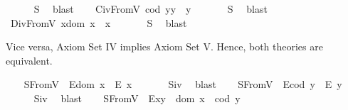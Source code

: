\begin{isabellebody}
%
\isadelimproof
\ \ \ \ %
\endisadelimproof
%
\isatagproof
{}\isamarkupfalse%
\ S{}\ \isamarkupfalse%
\ blast%
\endisatagproof
{\isafoldproof}%
%
\isadelimproof
\isanewline
%
\endisadelimproof
\ \ \isamarkupfalse%
\ C\isactrlsub i\isactrlsub vFromV{\isacharcolon}\ {\isachardoublequoteopen}{\isacharparenleft}cod\ y{\isacharparenright}{\isasymcdot}y\ {\isasymcong}\ y{\isachardoublequoteclose}\ \isanewline
%
\isadelimproof
\ \ \ \ %
\endisadelimproof
%
\isatagproof
{}\isamarkupfalse%
\ S{}\ \isamarkupfalse%
\ blast%
\endisatagproof
{\isafoldproof}%
%
\isadelimproof
\isanewline
%
\endisadelimproof
\ \ \isamarkupfalse%
\ D\isactrlsub i\isactrlsub vFromV{\isacharcolon}\ {\isachardoublequoteopen}x{\isasymcdot}{\isacharparenleft}dom\ x{\isacharparenright}\ {\isasymcong}\ x{\isachardoublequoteclose}\ \isanewline
%
\isadelimproof
\ \ \ \ %
\endisadelimproof
%
\isatagproof
{}\isamarkupfalse%
\ S{}\ \isamarkupfalse%
\ blast%
\endisatagproof
{\isafoldproof}%
%
\isadelimproof
%
\endisadelimproof
%
\begin{isamarkuptext}%
Vice versa, Axiom Set IV implies Axiom Set V. Hence, both theories are
 equivalent.%
\end{isamarkuptext}\isamarkuptrue%
\ \ \isamarkupfalse%
\ S{}FromV{\isacharcolon}\ \ {\isachardoublequoteopen}E{\isacharparenleft}dom\ x{\isacharparenright}\ \isactrlbold {\isasymrightarrow}\ E\ x{\isachardoublequoteclose}\ \isanewline
%
\isadelimproof
\ \ \ \ %
\endisadelimproof
%
\isatagproof
{}\isamarkupfalse%
\ S\isactrlsub i\isactrlsub v\ \isamarkupfalse%
\ blast%
\endisatagproof
{\isafoldproof}%
%
\isadelimproof
\isanewline
%
\endisadelimproof
\ \ \isamarkupfalse%
\ S{}FromV{\isacharcolon}\ \ {\isachardoublequoteopen}E{\isacharparenleft}cod\ y{\isacharparenright}\ \isactrlbold {\isasymrightarrow}\ E\ y{\isachardoublequoteclose}\ \isanewline
%
\isadelimproof
\ \ \ \ %
\endisadelimproof
%
\isatagproof
{}\isamarkupfalse%
\ S\isactrlsub i\isactrlsub v\ \isamarkupfalse%
\ blast%
\endisatagproof
{\isafoldproof}%
%
\isadelimproof
\isanewline
%
\endisadelimproof
\ \ \isamarkupfalse%
\ S{}FromV{\isacharcolon}\ \ {\isachardoublequoteopen}E{\isacharparenleft}x{\isasymcdot}y{\isacharparenright}\ \isactrlbold {\isasymleftrightarrow}\ dom\ x\ {\isasymsimeq}\ cod\ y{\isachardoublequoteclose}\ \isanewline

\end{isabellebody}

